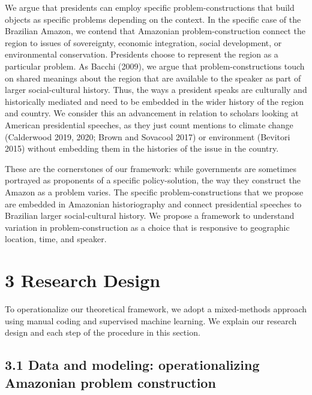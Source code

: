 \documentclass[
]{article}
\begin{document}
We argue that presidents can employ specific problem-constructions that
build objects as specific problems depending on the context. In the
specific case of the Brazilian Amazon, we contend that Amazonian
problem-construction connect the region to issues of sovereignty,
economic integration, social development, or environmental conservation.
Presidents choose to represent the region as a particular problem. As
Bacchi (2009), we argue that problem-constructions touch on shared
meanings about the region that are available to the speaker as part of
larger social-cultural history. Thus, the ways a president speaks are
culturally and historically mediated and need to be embedded in the
wider history of the region and country. We consider this an advancement
in relation to scholars looking at American presidential speeches, as
they just count mentions to climate change (Calderwood 2019, 2020; Brown
and Sovacool 2017) or environment (Bevitori 2015) without embedding them
in the histories of the issue in the country.

These are the cornerstones of our framework: while governments are
sometimes portrayed as proponents of a specific policy-solution, the way
they construct the Amazon as a problem varies. The specific
problem-constructions that we propose are embedded in Amazonian
historiography and connect presidential speeches to Brazilian larger
social-cultural history. We propose a framework to understand variation
in problem-construction as a choice that is responsive to geographic
location, time, and speaker.

\hypertarget{research-design}{%
\section{3 Research Design}\label{research-design}}

To operationalize our theoretical framework, we adopt a mixed-methods
approach using manual coding and supervised machine learning. We explain
our research design and each step of the procedure in this section.

\hypertarget{data-and-modeling-operationalizing-amazonian-problem-construction}{%
\subsection{3.1 Data and modeling: operationalizing Amazonian problem
construction}\label{data-and-modeling-operationalizing-amazonian-problem-construction}}
\end{document}
